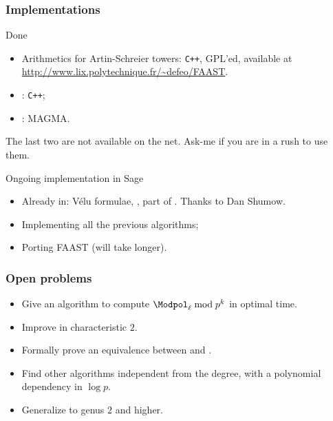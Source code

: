 \documentclass[10pt]{beamer}
\begin{document}
\begin{frame}
  \frametitle{Implementations}
  
  \begin{block}{Done}
    \begin{itemize}
    \item Arithmetics for Artin-Schreier towers: \texttt{C++}, GPL'ed,
      available at \url{http://www.lix.polytechnique.fr/~defeo/FAAST}.
    \item \cite{couveignes96}: \texttt{C++};
    \item \cite{bostan+morain+salvy+schost08,lercier+sirvent08}: MAGMA.
    \end{itemize}
    The last two are not available on the net. Ask-me if you are in a
    rush to use them.
  \end{block}

  \begin{block}{Ongoing implementation in Sage}
    \begin{itemize}
    \item Already in: Vélu formulae, \cite{strak73}, part of
      \cite{bostan+morain+salvy+schost08}. Thanks to Dan Shumow.
    \item Implementing all the previous algorithms;
    \item Porting FAAST (will take longer).
    \end{itemize}
  \end{block}
\end{frame}


\begin{frame}
  \frametitle{Open problems}

  \begin{itemize}
  \item Give an algorithm to compute $\Modpol_\ell \bmod p^k$ in
    optimal time.
  \item Improve \parencite{lercier+sirvent08} in characteristic $2$.
  \item Formally prove an equivalence between \parencite{couveignes94} and
    \parencite{couveignes96}.
  \item Find other algorithms independent from the degree, with a
    polynomial dependency in $\log p$.
  \item Generalize to genus $2$ and higher.
  \end{itemize}
\end{frame}
\end{document}
